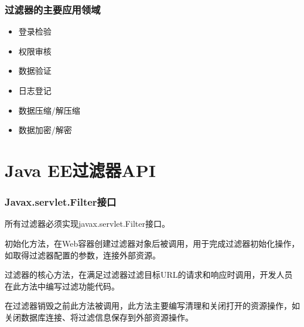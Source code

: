 \begin{frame}[fragile] %
\frametitle{过滤器的主要应用领域} 
\begin{itemize}
\item 登录检验
\item 权限审核
\item 数据验证
\item 日志登记
\item 数据压缩/解压缩
\item 数据加密/解密
\end{itemize}
\end{frame}

\section{Java EE过滤器API}

\begin{frame}[fragile] %
\frametitle{Javax.servlet.Filter接口} 

所有过滤器必须实现javax.servlet.Filter接口。


初始化方法，在Web容器创建过滤器对象后被调用，用于完成过滤器初始化操作，如取得过滤器配置的参数，连接外部资源。


过滤器的核心方法，在满足过滤器过滤目标URL的请求和响应时调用，开发人员在此方法中编写过滤功能代码。


在过滤器销毁之前此方法被调用，此方法主要编写清理和关闭打开的资源操作，如关闭数据库连接、将过滤信息保存到外部资源操作。
\end{frame}

